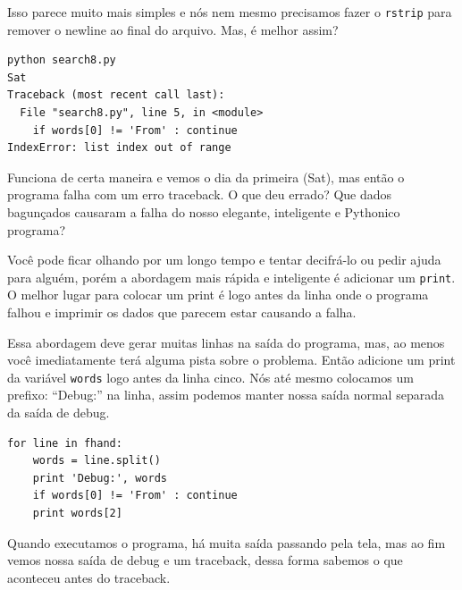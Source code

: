 \begin{enumerate}
Isso parece muito mais simples e nós nem mesmo precisamos fazer o
{\tt rstrip} para remover o newline ao final do arquivo.
Mas, é melhor assim?

\beforeverb
\begin{verbatim}
python search8.py 
Sat
Traceback (most recent call last):
  File "search8.py", line 5, in <module>
    if words[0] != 'From' : continue
IndexError: list index out of range
\end{verbatim}
\afterverb
%

Funciona de certa maneira e vemos o dia da primeira
(Sat), mas então o programa falha com um erro traceback.
O que deu errado? Que dados bagunçados causaram a falha do
nosso elegante, inteligente e Pythonico programa?

Você pode ficar olhando por um longo tempo e tentar decifrá-lo ou
pedir ajuda para alguém, porém a abordagem mais rápida e inteligente
é adicionar um {\tt print}. O melhor lugar para colocar um print é
logo antes da linha onde o programa falhou e imprimir os dados que 
parecem estar causando a falha.

Essa abordagem deve gerar muitas linhas na saída do programa,
mas, ao menos você imediatamente terá alguma pista sobre o problema.
Então adicione um print da variável {\tt words} logo antes da linha cinco.
Nós até mesmo colocamos um prefixo: ``Debug:'' na linha, assim podemos 
manter nossa saída normal separada da saída de debug.

\beforeverb
\begin{verbatim}
for line in fhand:
    words = line.split()
    print 'Debug:', words
    if words[0] != 'From' : continue
    print words[2]
\end{verbatim}
\afterverb
%
Quando executamos o programa, há muita saída passando pela tela,
mas ao fim vemos nossa saída de debug e um traceback, dessa forma
sabemos o que aconteceu antes do traceback.


\end{enumerate}

